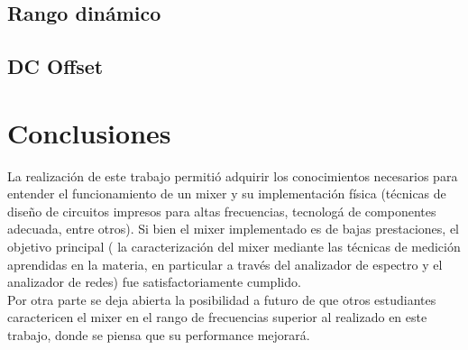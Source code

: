 \documentclass[a4paper,10pt]{article}
\begin{document}
	\subsection{Rango din\'amico}
	\subsection{DC Offset}
	\newpage
	\section{Conclusiones}
	\indent La realizaci\'on de este trabajo permiti\'o adquirir los 
	conocimientos necesarios para entender el funcionamiento de un mixer y su 
	implementaci\'on f\'isica (t\'ecnicas de dise\~no de circuitos impresos para
	altas frecuencias, tecnolog\'a de componentes adecuada, entre otros). Si 
	bien el mixer implementado es de bajas prestaciones, el objetivo principal (
	la caracterizaci\'on del mixer mediante las t\'ecnicas de medici\'on 
	aprendidas en la materia, en particular a trav\'es del analizador de 
	espectro y el analizador de redes) fue satisfactoriamente cumplido. \\
	\indent Por otra parte se deja abierta la posibilidad a futuro de que otros 
	estudiantes caractericen el mixer en el rango de frecuencias superior al 
	realizado en este trabajo, donde se piensa que su performance mejorar\'a. 
	
	\newpage
\end{document}
